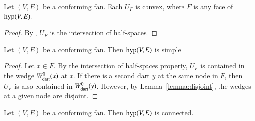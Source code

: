 \begin{lemma}
Let $(V,E)$ be a conforming fan.  
Each $U_F$ is convex, where  $F$ is any face of ${\operatorname{hyp}}(V,E)$.
\end{lemma}
%
%

\begin{proof} By , $U_F$ is the intersection of
half-spaces.
\end{proof}

\begin{lemma}  
Let $(V,E)$ be a conforming fan.  
Then ${\operatorname{hyp}}(V,E)$ is simple.
\end{lemma}
%

\begin{proof} Let $x\in F$.  By the intersection of half-spaces
property, $U_F$ is contained in the wedge $W^0_{\text{dart}}(x)$ at $x$.  If
there is a second dart $y$ at the same node in $F$, then $U_F$ is
also contained in $W^0_{\text{dart}}(y)$. However, by
Lemma~\ref{lemma:disjoint}, the wedges at a given node are disjoint.
\end{proof}

\begin{lemma}  
Let $(V,E)$ be a conforming fan.  
Then ${\operatorname{hyp}}(V,E)$ is connected.
\end{lemma}
%
%
%


